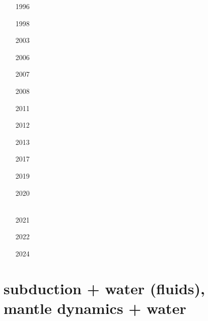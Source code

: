 \begin{small}
\begin{itemize}
\item[1996]
\item[1998]
\item[2003]
\item[2006]
\item[2007]
\item[2008]
\item[2011]
\item[2012]
\\
\item[2013]
\item[2017]
\\
\item[2019]
\item[2020]
\\
\\
\item[2021]
\item[2022]
\item[2024]
\\
\end{itemize}
\end{small}

\section{subduction + water (fluids), mantle dynamics + water}

